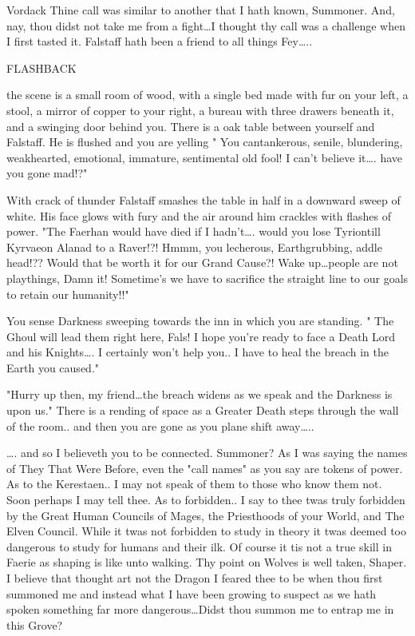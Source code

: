 {Vordack			Thine call was similar to another that I hath known, Summoner. 
And, nay, thou didst not take me from a fight\dots I thought thy call 
was a challenge when I first tasted it. Falstaff hath been a friend to 
all things Fey\dots..

FLASHBACK
{the scene is a small room of wood, with a single bed made with fur on 
your left, a stool, a mirror of copper to your right, a bureau with 
three drawers beneath it, and a swinging door behind you. There is a oak 
table between yourself and Falstaff. He is flushed and you are yelling "
You cantankerous, senile, blundering, weak\-hearted, emotional, 
immature, sentimental old fool! I can't believe it\dots. have you gone mad!?"

With crack of thunder Falstaff smashes the table in half in a downward 
sweep of white. His face glows with fury and the air around him crackles 
with flashes of power. "The Faer\-han would have died if I hadn't\dots. 
would you lose Tyriontill Kyrvaeon Alan\-ad to a Raver!?! Hmmm, you 
lecherous, Earth\-grubbing, addle head!?? Would that be worth it for our 
Grand Cause?! Wake up\dots people are not playthings, Damn it! Sometime's 
we have to sacrifice the straight line to our goals to retain our humanity!!"

You sense Darkness sweeping towards the inn in which you are standing. "
The Ghoul will lead them right here, Fals! I hope you're ready to face a 
Death Lord and his Knights\dots. I certainly won't help you.. I have to 
heal the breach in the Earth you caused."

"Hurry up then, my friend\dots the breach widens as we speak and the 
Darkness is upon us." There is a rending of space as a Greater Death 
steps through the wall of the room.. and then you are gone as you plane 
shift away\dots..}

\dots. and so I believeth you to be connected. Summoner? As I was saying 
the names of They That Were Before, even the "call names" as you say are 
tokens of power. As to the Kerestaen.. I may not speak of them to those 
who know them not. Soon perhaps I may tell thee. As to forbidden.. I say 
to thee twas truly forbidden by the Great Human Councils of Mages, the 
Priesthoods of your World, and The Elven Council. While it twas not 
forbidden to study in theory it twas deemed too dangerous to study for 
humans and their ilk. Of course it tis not a true skill in Faerie as 
shaping is like unto walking.  Thy point on Wolves is well taken, Shaper.
I believe that thought art not the Dragon I feared thee to be when thou 
first summoned me and instead what I have been growing to suspect as we 
hath spoken\- something far more dangerous\dots Didst thou summon me to 
entrap me in this Grove?

}
